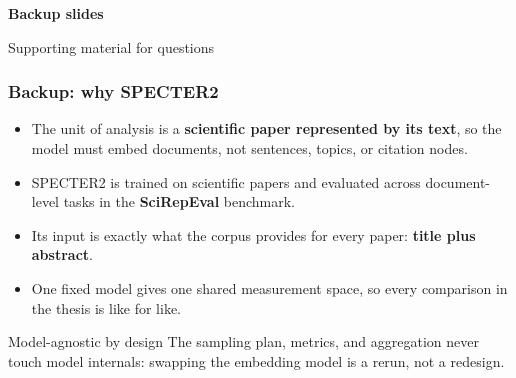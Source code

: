 \documentclass[
	11pt, %
	aspectratio=169, %
]{beamer}
\begin{document}
\begin{frame}[plain]
	\begin{center}
		{\LARGE\bfseries\textcolor{UC3MBlue}{Backup slides}}

		\medskip
		{\small Supporting material for questions}
	\end{center}
\end{frame}


\begin{frame}
	\frametitle{Backup: why SPECTER2}

	\begin{itemize}
		\setlength{\itemsep}{0.6em}
		\item The unit of analysis is a \textbf{scientific paper represented by its text}, so the model must embed documents, not sentences, topics, or citation nodes.
		\item SPECTER2 is trained on scientific papers and evaluated across document-level tasks in the \textbf{SciRepEval} benchmark.
		\item Its input is exactly what the corpus provides for every paper: \textbf{title plus abstract}.
		\item One fixed model gives one shared measurement space, so every comparison in the thesis is like for like.
	\end{itemize}

	\medskip

	\begin{block}{Model-agnostic by design}
		The sampling plan, metrics, and aggregation never touch model internals: swapping the embedding model is a rerun, not a redesign.
	\end{block}
\end{frame}

\end{document}
